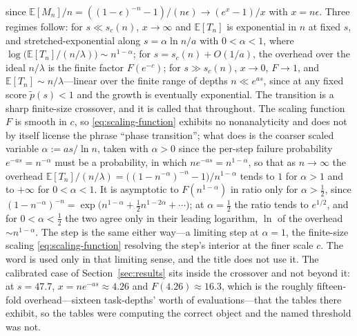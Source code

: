 \documentclass{article}
\begin{document}
since $\mathbb{E}[M_n]/n = ((1-\epsilon)^{-n} - 1)/(n\epsilon) \to (e^{x} - 1)/x$ with $x = n\epsilon$. Three regimes follow: for $s \ll s_c(n)$, $x \to \infty$ and $\mathbb{E}[T_n]$ is exponential in $n$ at fixed $s$, and stretched-exponential along $s = \alpha\ln n/a$ with $0 < \alpha < 1$, where $\log\big(\mathbb{E}[T_n]/(n/\lambda)\big) \sim n^{1-\alpha}$; for $s = s_c(n) + O(1/a)$, the overhead over the ideal $n/\lambda$ is the finite factor $F(e^{-c})$; for $s \gg s_c(n)$, $x \to 0$, $F \to 1$, and $\mathbb{E}[T_n] \sim n/\lambda$---linear over the finite range of depths $n \ll e^{as}$, since at any fixed score $\widetilde{p}(s) < 1$ and the growth is eventually exponential. The transition is a sharp finite-size crossover, and it is called that throughout. The scaling function $F$ is smooth in $c$, so \eqref{eq:scaling-function} exhibits no nonanalyticity and does not by itself license the phrase ``phase transition''; what does is the coarser scaled variable $\alpha := as/\ln n$, taken with $\alpha > 0$ since the per-step failure probability $e^{-as} = n^{-\alpha}$ must be a probability, in which $n e^{-as} = n^{1-\alpha}$, so that as $n \to \infty$ the overhead $\mathbb{E}[T_n]/(n/\lambda) = \big((1 - n^{-\alpha})^{-n} - 1\big)/n^{1-\alpha}$ tends to $1$ for $\alpha > 1$ and to $+\infty$ for $0 < \alpha < 1$. It is asymptotic to $F(n^{1-\alpha})$ in ratio only for $\alpha > \tfrac12$, since $(1 - n^{-\alpha})^{-n} = \exp\big(n^{1-\alpha} + \tfrac12 n^{1-2\alpha} + \cdots\big)$; at $\alpha = \tfrac12$ the ratio tends to $e^{1/2}$, and for $0 < \alpha < \tfrac12$ the two agree only in their leading logarithm, $\ln$ of the overhead $\sim n^{1-\alpha}$. The step is the same either way---a limiting step at $\alpha = 1$, the finite-size scaling \eqref{eq:scaling-function} resolving the step's interior at the finer scale $c$. The word is used only in that limiting sense, and the title does not use it. The calibrated case of Section~\ref{sec:results} sits inside the crossover and not beyond it: at $s = 47.7$, $x = n e^{-as} \approx 4.26$ and $F(4.26) \approx 16.3$, which is the roughly fifteen-fold overhead---sixteen task-depths' worth of evaluations---that the tables there exhibit, so the tables were computing the correct object and the named threshold was not.
\end{document}
